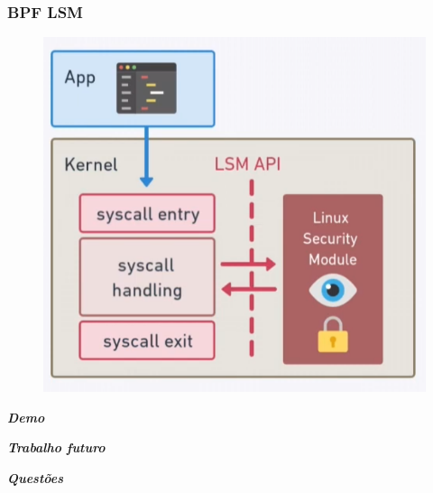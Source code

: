 \documentclass[pdflatex,compress]{beamer}
\begin{document}
\begin{frame}
\frametitle{BPF LSM}


\begin{figure}[x]
\includegraphics[scale=0.25]{images/lsm2.png}
\centering
\end{figure}

\end{frame}





\begin{frame}{}
  \centering \Huge
  \textbf{\emph{Demo}}
\end{frame}

\begin{frame}{}
  \centering \Huge
  \textbf{\emph{Trabalho futuro}}
\end{frame}

\begin{frame}{}
  \centering \Huge
  \textbf{\emph{Questões}}
\end{frame}
\end{document}
